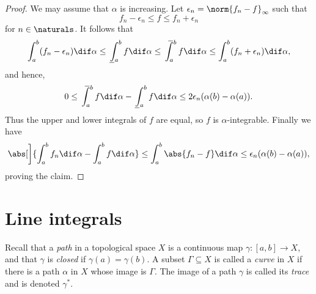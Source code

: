 \documentclass[article, a4paper, 11pt, oneside]{memoir}
\numberwithin{equation}{chapter}
\begin{document}
\begin{proof}
    We may assume that $\alpha$ is increasing. Let $\epsilon_n = \norm{f_n - f}_\infty$ such that
    \begin{equation*}
        f_n - \epsilon_n
            \leq f
            \leq f_n + \epsilon_n
    \end{equation*}
    for $n \in \naturals$. It follows that
    \begin{equation*}
        \int_a^b (f_n - \epsilon_n) \dif\alpha
            \leq \lowint_a^b f \dif\alpha
            \leq \upint_a^b f \dif\alpha
            \leq \int_a^b (f_n + \epsilon_n) \dif\alpha,
    \end{equation*}
    and hence,
    \begin{equation*}
        0
            \leq \upint_a^b f \dif\alpha - \lowint_a^b f \dif\alpha
            \leq 2 \epsilon_n (\alpha(b) - \alpha(a)).
    \end{equation*}
    Thus the upper and lower integrals of $f$ are equal, so $f$ is $\alpha$-integrable. Finally we have
    \begin{equation*}
        \abs[\bigg]{ \int_a^b f_n \dif\alpha - \int_a^b f \dif\alpha }
            \leq \int_a^b \abs{f_n - f} \dif\alpha
            \leq \epsilon_n (\alpha(b) - \alpha(a)),
    \end{equation*}
    proving the claim.
\end{proof}


\section{Line integrals}

\newcommand{\partition}{\mathcal{P}}
\newcommand{\grad}{\nabla}

\noindent Recall that a \emph{path} in a topological space $X$ is a continuous map $\gamma \colon [a,b] \to X$, and that $\gamma$ is \emph{closed} if $\gamma(a) = \gamma(b)$. A subset $\Gamma \subseteq X$ is called a \emph{curve} in $X$ if there is a path $\alpha$ in $X$ whose image is $\Gamma$. The image of a path $\gamma$ is called its \emph{trace} and is denoted $\gamma^*$.
\end{document}
